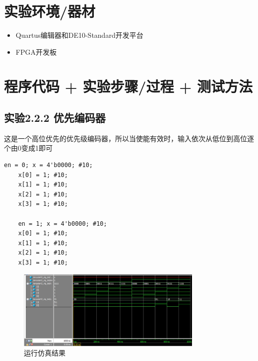 \documentclass[12pt,a4paper,UTF8]{article}
\begin{document}
\section{实验环境/器材}
\begin{itemize}
  \item Quartus编辑器和DE10-Standard开发平台
  \item FPGA开发板
\end{itemize}

\section{程序代码 + 实验步骤/过程 + 测试方法}
\subsection{实验2.2.2 优先编码器}
这是一个高位优先的优先级编码器，所以当使能有效时，输入依次从低位到高位逐个由0变成1即可
\begin{lstlisting}[style=verilog-style]
	en = 0; x = 4'b0000; #10;
	x[0] = 1; #10;
	x[1] = 1; #10;
	x[2] = 1; #10;
	x[3] = 1; #10;
	
	en = 1; x = 4'b0000; #10;
	x[0] = 1; #10;
	x[1] = 1; #10;
	x[2] = 1; #10;
	x[3] = 1; #10;
\end{lstlisting}

\begin{figure}[H]
  \centering
  \includegraphics[width=0.8\textwidth]{2_2_2sim.JPG}
  \caption{运行仿真结果}
  \label{encoder_sim}
\end{figure}
\end{document}
